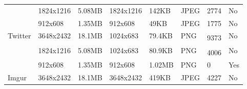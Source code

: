 \begin{table}[]
\begin{tabular}{@{}llllllll@{}}
																& 1824x1216                                                  & 5.08MB                                               & 1824x1216                                                  & 142KB                                                & JPEG															   & 2774                                                   & No                                                         \\
																& 912x608                                                    & 1.35MB                                               & 912x608                                                    & 49KB                                                 & JPEG															   & 1775                                                   & No                                                         \\ \midrule
		\multirow{3}{*}{Twitter}                                & 3648x2432                                                  & 18.1MB                                               & 1024x683                                                   & 79.4KB                                               & PNG															   & 9373\textsuperscript{\textdagger} 		                & No                                                         \\
																& 1824x1216                                                  & 5.08MB                                               & 1024x683                                                   & 80.9KB                                               & PNG														       & 4006\textsuperscript{\textdagger}         		        & No                                                         \\
																& 912x608                                                    & 1.35MB                                               & 912x608                                                    & 1.02MB                                               & PNG															   & 0                                                      & Yes                                                        \\ \midrule
		\multirow{3}{*}{Imgur}                                  & 3648x2432                                                  & 18.1MB                                               & 3648x2432                                                  & 419KB                                                & JPEG									   						   & 4227                                                   & No                                                         \\

\end{tabular}
\end{table}
